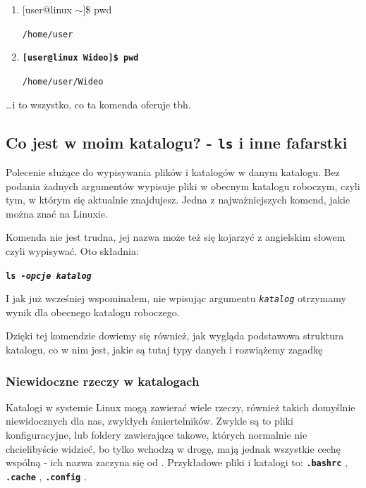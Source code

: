 \documentclass[12pt]{article}
\makeatletter
\newcommand{\ttbf}[1]{
    \texttt{\textbf{#1}}
}
\newenvironment{console1}
{
    \ttfamily
    \fontseries{b}
    \selectfont
    {[}user@linux $\sim${]}\$} {

    }
\makeatother
\begin{document}
\begin{enumerate}
    \item \begin{console1}
        pwd
    \end{console1}
    
    \texttt{/home/user}

    \item \ttbf{[user@linux Wideo]\$ pwd}

    \texttt{/home/user/Wideo}
\end{enumerate}

\dots i to wszystko, co ta komenda oferuje tbh.

\subsection{Co jest w moim katalogu? - \texttt{ls} i inne fafarstki}
\label{sec:ls}

Polecenie służące do wypisywania plików i katalogów w danym katalogu. Bez podania żadnych argumentów wypisuje pliki w obecnym katalogu roboczym, czyli tym, w którym się aktualnie znajdujesz. Jedna z najważniejszych komend, jakie można znać na Linuxie.

Komenda nie jest trudna, jej nazwa może też się kojarzyć z angielskim słowem  czyli wypisywać. Oto składnia:

\ttbf{ls \emph{-opcje} \emph{katalog}}

I jak już wcześniej wspominałem, nie wpisując argumentu \texttt{\emph{katalog}} otrzymamy wynik dla obecnego katalogu roboczego.

Dzięki tej komendzie dowiemy się również, jak wygląda podstawowa struktura katalogu, co w nim jest, jakie są tutaj typy danych i rozwiążemy zagadkę 

\subsubsection{Niewidoczne rzeczy w katalogach}

Katalogi w systemie Linux mogą zawierać wiele rzeczy, również takich domyślnie niewidocznych dla nas, zwykłych śmiertelników. Zwykle są to pliki konfiguracyjne, lub foldery zawierające takowe, których normalnie nie chcielibyście widzieć, bo tylko wchodzą w drogę, mają jednak wszystkie cechę wspólną - ich nazwa zaczyna się od \say{\ttbf{.}}. Przykładowe pliki i katalogi to: \ttbf{.bashrc}, \ttbf{.cache}, \ttbf{.config}.
\end{document}
